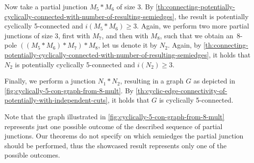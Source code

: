 \documentclass[12pt, twoside]{book}
\begin{document}
\begin{example}
	Now take a partial junction $M_5*M_6$ of size 3. By \cref{th:connecting-potentially-cyclically-connected-with-number-of-resulting-semiedges}, the result is potentially cyclically \mbox{5-connected} and $i(M_5*M_6)\geq 3$. Again, we perform two more partial junctions of size 3, first with $M_7$, and then with $M_8$, such that we obtain an~8-pole ${\left((M_5*M_6)*M_7\right)*M_8}$, let us denote it by $N_2$. Again, by \cref{th:connecting-potentially-cyclically-connected-with-number-of-resulting-semiedges}, it holds that $N_2$ is potentially cyclically 5-connected and $i(N_2)\geq 3$.
	
	Finally, we perform a junction $N_1*N_2$, resulting in a graph $G$ as depicted in \cref{fig:cyclically-5-con-graph-from-8-mult}. By \cref{th:cyclic-edge-connectivity-of-potentially-with-independent-cuts}, it holds that $G$ is cyclically 5-connected.
	
	Note that the graph illustrated in \cref{fig:cyclically-5-con-graph-from-8-mult} represents just one possible outcome of the described sequence of partial junctions. Our theorems do not specify on which semiedges the partial junction should be performed, thus the showcased result represents only one of the possible outcomes.
\end{example}
\end{document}
